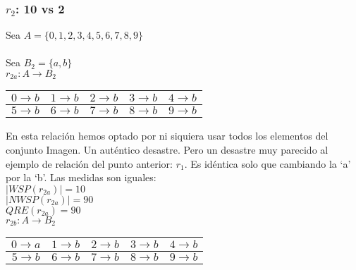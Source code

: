 	\subsubsection{$r_{2}$: 10 vs 2}
	
	\noindent
	Sea $A=\{0,1,2,3,4,5,6,7,8,9\}$\\\\
	Sea $B_{2} = \{a,b\}$
	\\
	
	\noindent
	$r_{2a}:A \longrightarrow B_{2}$
	\begin{table}[h!]
		\begin{tabular}{|c|c|c|c|c|}
			\hline
			$0 \longrightarrow b$ & $1 \longrightarrow b$ & $2 \longrightarrow b$ & $3 \longrightarrow b$ & $4 \longrightarrow b$ \\ 
			\hline
			$5 \longrightarrow b$ & $6 \longrightarrow b$ & $7 \longrightarrow b$ & $8 \longrightarrow b$ & $9 \longrightarrow b$ \\  
			\hline
		\end{tabular}
	\end{table}
	
	\noindent
	En esta relación hemos optado por ni siquiera usar todos los elementos del conjunto Imagen. Un auténtico desastre. Pero un desastre muy parecido al ejemplo de relación del punto anterior: $r_{1}$. Es idéntica solo que cambiando la `a' por la `b'. Las medidas son iguales:\\
	$|WSP(r_{2a})| = 10$\\
	$|NWSP(r_{2a})| = 90$\\
	$QRE(r_{2a})=90$
	\\
	
	\noindent
	$r_{2b}:A \longrightarrow B_{2}$
	\begin{table}[h!]
		\begin{tabular}{|c|c|c|c|c|}
			\hline
			$0 \longrightarrow a$ & $1 \longrightarrow b$ & $2 \longrightarrow b$ & $3 \longrightarrow b$ & $4 \longrightarrow b$ \\ 
			\hline
			$5 \longrightarrow b$ & $6 \longrightarrow b$ & $7 \longrightarrow b$ & $8 \longrightarrow b$ & $9 \longrightarrow b$ \\  
			\hline
		\end{tabular}
	\end{table}
	
